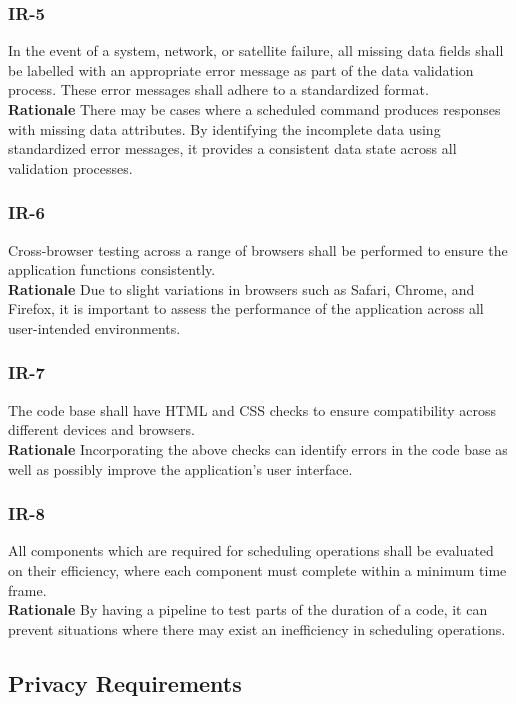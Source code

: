 \documentclass[12pt]{article}
\begin{document}
\subsubsection*{IR-5}
In the event of a system, network, or satellite failure, all missing data fields shall be labelled with an appropriate error message as part of the data validation process. These error messages shall adhere to a standardized format. \\
\textbf{Rationale} There may be cases where a scheduled command produces responses with missing data attributes. By identifying the incomplete data using standardized error messages, it provides a consistent data state across all validation processes.

\subsubsection*{IR-6}
Cross-browser testing across a range of browsers shall be performed to ensure the application functions consistently. \\
\textbf{Rationale} Due to slight variations in browsers such as Safari, Chrome, and Firefox, it is important to assess the performance of the application across all user-intended environments.

\subsubsection*{IR-7}
The code base shall have HTML and CSS checks to ensure compatibility across different devices and browsers. \\
\textbf{Rationale} Incorporating the above checks can identify errors in the code base as well as possibly improve the application’s user interface.

\subsubsection*{IR-8}
All components which are required for scheduling operations shall be evaluated on their efficiency, where each component must complete within a minimum time frame. \\
\textbf{Rationale} By having a pipeline to test parts of the duration of a code, it can prevent situations where there may exist an inefficiency in scheduling operations.


\subsection{Privacy Requirements}
\end{document}
